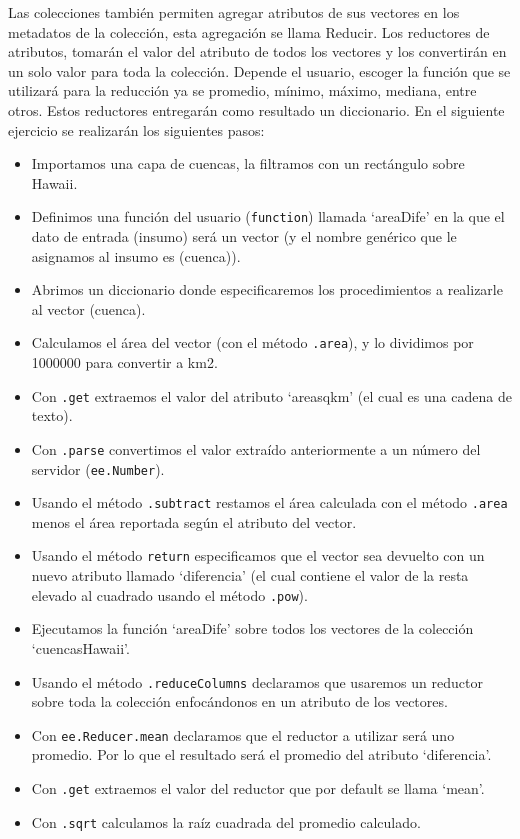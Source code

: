 \documentclass[
  12pt,
  letterpaper,
  twoside]{book}
\providecommand{\tightlist}{%
  \setlength{\itemsep}{0pt}\setlength{\parskip}{0pt}}
\begin{document}
Las colecciones también permiten agregar atributos de sus vectores en los metadatos de la colección, esta agregación se llama Reducir. Los reductores de atributos, tomarán el valor del atributo de todos los vectores y los convertirán en un solo valor para toda la colección. Depende el usuario, escoger la función que se utilizará para la reducción ya se promedio, mínimo, máximo, mediana, entre otros. Estos reductores entregarán como resultado un diccionario. En el siguiente ejercicio se realizarán los siguientes pasos:

\begin{itemize}
\tightlist
\item
  Importamos una capa de cuencas, la filtramos con un rectángulo sobre Hawaii.
\item
  Definimos una función del usuario (\texttt{function}) llamada `areaDife' en la que el dato de entrada (insumo) será un vector (y el nombre genérico que le asignamos al insumo es (cuenca)).
\item
  Abrimos un diccionario donde especificaremos los procedimientos a realizarle al vector (cuenca).
\item
  Calculamos el área del vector (con el método \texttt{.area}), y lo dividimos por 1000000 para convertir a km2.
\item
  Con \texttt{.get} extraemos el valor del atributo `areasqkm' (el cual es una cadena de texto).
\item
  Con \texttt{.parse} convertimos el valor extraído anteriormente a un número del servidor (\texttt{ee.Number}).
\item
  Usando el método \texttt{.subtract} restamos el área calculada con el método \texttt{.area} menos el área reportada según el atributo del vector.
\item
  Usando el método \texttt{return} especificamos que el vector sea devuelto con un nuevo atributo llamado `diferencia' (el cual contiene el valor de la resta elevado al cuadrado usando el método \texttt{.pow}).
\item
  Ejecutamos la función `areaDife' sobre todos los vectores de la colección `cuencasHawaii'.
\item
  Usando el método \texttt{.reduceColumns} declaramos que usaremos un reductor sobre toda la colección enfocándonos en un atributo de los vectores.
\item
  Con \texttt{ee.Reducer.mean} declaramos que el reductor a utilizar será uno promedio. Por lo que el resultado será el promedio del atributo `diferencia'.
\item
  Con \texttt{.get} extraemos el valor del reductor que por default se llama `mean'.
\item
  Con \texttt{.sqrt} calculamos la raíz cuadrada del promedio calculado.
\end{itemize}
\end{document}
